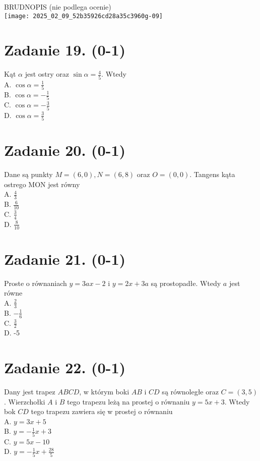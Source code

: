 \documentclass[10pt]{article}
\begin{document}
BRUDNOPIS (nie podlega ocenie)\\
\texttt{[image: 2025\_02\_09\_52b35926cd28a35c3960g-09]}

\section*{Zadanie 19. (0-1)}
Kąt \(\alpha\) jest ostry oraz \(\sin \alpha=\frac{4}{5}\). Wtedy\\
A. \(\cos \alpha=\frac{1}{5}\)\\
B. \(\cos \alpha=-\frac{1}{5}\)\\
C. \(\cos \alpha=-\frac{3}{5}\)\\
D. \(\cos \alpha=\frac{3}{5}\)

\section*{Zadanie 20. (0-1)}
Dane są punkty \(M=(6,0), N=(6,8)\) oraz \(O=(0,0)\). Tangens kąta ostrego MON jest równy\\
A. \(\frac{4}{3}\)\\
B. \(\frac{6}{10}\)\\
C. \(\frac{3}{4}\)\\
D. \(\frac{8}{10}\)

\section*{Zadanie 21. (0-1)}
Proste o równaniach \(y=3 a x-2\) i \(y=2 x+3 a\) są prostopadłe. Wtedy \(a\) jest równe\\
A. \(\frac{2}{3}\)\\
B. \(-\frac{1}{6}\)\\
C. \(\frac{3}{2}\)\\
D. -5

\section*{Zadanie 22. (0-1)}
Dany jest trapez \(A B C D\), w którym boki \(A B\) i \(C D\) są równoległe oraz \(C=(3,5)\). Wierzchołki \(A\) i \(B\) tego trapezu leżą na prostej o równaniu \(y=5 x+3\). Wtedy bok \(C D\) tego trapezu zawiera się w prostej o równaniu\\
A. \(y=3 x+5\)\\
B. \(y=-\frac{1}{5} x+3\)\\
C. \(y=5 x-10\)\\
D. \(y=-\frac{1}{5} x+\frac{28}{5}\)
\end{document}
